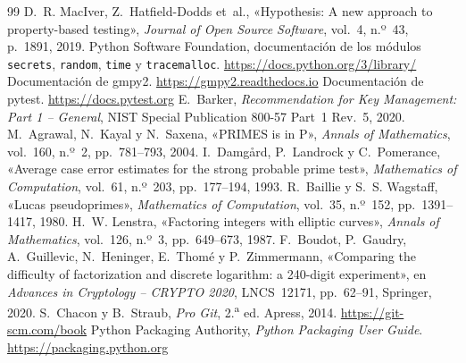 \begin{thebibliography}{99}
 D.~R. MacIver, Z.~Hatfield-Dodds et~al., «Hypothesis: A new
  approach to property-based testing», \emph{Journal of Open Source Software},
  vol.~4, n.º~43, p.~1891, 2019.
 Python Software Foundation, documentación de los módulos
  \texttt{secrets}, \texttt{random}, \texttt{time} y \texttt{tracemalloc}.
  \url{https://docs.python.org/3/library/}
 Documentación de gmpy2. \url{https://gmpy2.readthedocs.io}
 Documentación de pytest. \url{https://docs.pytest.org}
 E.~Barker, \emph{Recommendation for Key Management: Part 1 -- General},
  NIST Special Publication 800-57 Part~1 Rev.~5, 2020.
 M.~Agrawal, N.~Kayal y N.~Saxena, «PRIMES is in P», \emph{Annals of Mathematics},
  vol.~160, n.º~2, pp.~781--793, 2004.
 I.~Damgård, P.~Landrock y C.~Pomerance, «Average case error estimates for the
  strong probable prime test», \emph{Mathematics of Computation}, vol.~61, n.º~203, pp.~177--194, 1993.
 R.~Baillie y S.~S. Wagstaff, «Lucas pseudoprimes», \emph{Mathematics of
  Computation}, vol.~35, n.º~152, pp.~1391--1417, 1980.
 H.~W. Lenstra, «Factoring integers with elliptic curves», \emph{Annals of
  Mathematics}, vol.~126, n.º~3, pp.~649--673, 1987.
 F.~Boudot, P.~Gaudry, A.~Guillevic, N.~Heninger, E.~Thomé y P.~Zimmermann,
  «Comparing the difficulty of factorization and discrete logarithm: a 240-digit experiment», en
  \emph{Advances in Cryptology -- CRYPTO 2020}, LNCS~12171, pp.~62--91, Springer, 2020.
 S.~Chacon y B.~Straub, \emph{Pro Git}, 2.\textsuperscript{a} ed. Apress, 2014.
  \url{https://git-scm.com/book}
 Python Packaging Authority, \emph{Python Packaging User Guide}.
  \url{https://packaging.python.org}
\end{thebibliography}
\endgroup

\newpage
